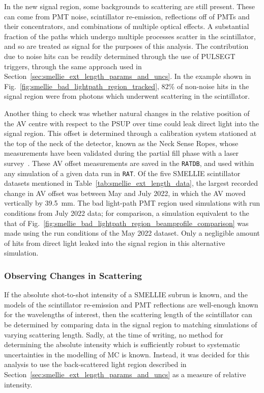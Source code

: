 In the new signal region, some backgrounds to scattering are still present. These can come from PMT noise, scintillator re-emission, reflections off of PMTs and their concentrators, and combinations of multiple optical effects. A substantial fraction of the paths which undergo multiple processes scatter in the scintillator, and so are treated as signal for the purposes of this analysis. The contribution due to noise hits can be readily determined through the use of PULSEGT triggers, through the same approach used in Section~\ref{sec:smellie_ext_length_params_and_uncs}. In the example shown in Fig.~\ref{fig:smellie_bad_lightpath_region_tracked}, 82\% of non-noise hits in the signal region were from photons which underwent scattering in the scintillator.

Another thing to check was whether natural changes in the relative position of the AV centre with respect to the PSUP over time could leak direct light into the signal region. This offset is determined through a calibration system stationed at the top of the neck of the detector, known as the Neck Sense Ropes, whose measurements have been validated during the partial fill phase with a laser survey~\cite{khaghaniNeckSenseRope2015,khaghani16NCalibrationBackground2022}. These AV offset measurements are saved in the \texttt{RATDB}, and used within any simulation of a given data run in \texttt{RAT}. Of the five SMELLIE scintillator datasets mentioned in Table~\ref{tab:smellie_ext_length_data}, the largest recorded change in AV offset was between May and July 2022, in which the AV moved vertically by \SI{39.5}{\mm}. The bad light-path PMT region used simulations with run conditions from July 2022 data; for comparison, a simulation equivalent to the that of Fig.~\ref{fig:smellie_bad_lightpath_region_beamprofile_comparison} was made using the run conditions of the May 2022 dataset. Only a negligible amount of hits from direct light leaked into the signal region in this alternative simulation.

\subsubsection{Observing Changes in Scattering}
If the absolute shot-to-shot intensity of a SMELLIE subrun is known, and the models of the scintillator re-emission and PMT reflections are well-enough known for the wavelengths of interest, then the scattering length of the scintillator can be determined by comparing data in the signal region to matching simulations of varying scattering length. Sadly, at the time of writing, no method for determining the absolute intensity which is sufficiently robust to systematic uncertainties in the modelling of MC is known. Instead, it was decided for this analysis to use the back-scattered light region described in Section~\ref{sec:smellie_ext_length_params_and_uncs} as a measure of relative intensity.

